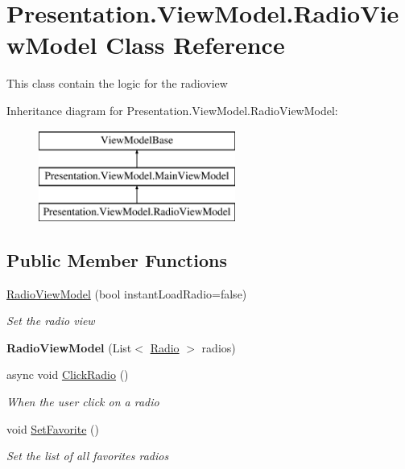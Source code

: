 \hypertarget{class_presentation_1_1_view_model_1_1_radio_view_model}{}\section{Presentation.\+View\+Model.\+Radio\+View\+Model Class Reference}
\label{class_presentation_1_1_view_model_1_1_radio_view_model}


This class contain the logic for the radioview  


Inheritance diagram for Presentation.\+View\+Model.\+Radio\+View\+Model\+:\begin{figure}[H]
\begin{center}
\leavevmode
\includegraphics[height=3.000000cm]{class_presentation_1_1_view_model_1_1_radio_view_model}
\end{center}
\end{figure}
\subsection*{Public Member Functions}
\begin{DoxyCompactItemize}
\item 
\hyperlink{class_presentation_1_1_view_model_1_1_radio_view_model_a4aef9d2a4f49274c52d5a6ea6007a5f1}{Radio\+View\+Model} (bool instant\+Load\+Radio=false)
\begin{DoxyCompactList}\small\item\em Set the radio view \end{DoxyCompactList}\item 
\mbox{\label{class_presentation_1_1_view_model_1_1_radio_view_model_a0ba2835000d7714bde77a6190ef21938}} 
{\bfseries Radio\+View\+Model} (List$<$ \hyperlink{class_d_t_o_1_1_entity_1_1_radio}{Radio} $>$ radios)
\item 
async void \hyperlink{class_presentation_1_1_view_model_1_1_radio_view_model_a30f5ad6064bd95c78ecc66061b7e7afb}{Click\+Radio} ()
\begin{DoxyCompactList}\small\item\em When the user click on a radio \end{DoxyCompactList}\item 
void \hyperlink{class_presentation_1_1_view_model_1_1_radio_view_model_a66d0f5118de150b5c1cc6cde2eef710a}{Set\+Favorite} ()
\begin{DoxyCompactList}\small\item\em Set the list of all favorites radios \end{DoxyCompactList}\end{DoxyCompactItemize}
